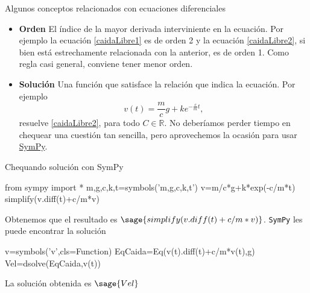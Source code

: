 \documentclass[handout,hyperref={colorlinks=true}]{beamer}
\newcommand{\rr}{\mathbb{R}}
\newcommand{\nl}{\onslide<+-> }
\begin{document}
\begin{frame}{Algunos conceptos relacionados con ecuaciones diferenciales}
\begin{itemize}
\nl  \item \textbf{Orden} El índice de la mayor derivada interviniente en la ecuación. Por ejemplo la ecuación \eqref{caidaLibre1} es de orden 2 y la
ecuación \eqref{caidaLibre2}, si bien está estrechamente relacionada con la anterior, es de orden 1. Como regla casi general, conviene tener menor orden.

\nl  \item \textbf{Solución} Una función que satisface la relación que indica la ecuación. Por ejemplo
\begin{equation}\label{SolGencaidaLibre2} v(t)=\frac{m}{c}g+ke^{-\frac{c}{m}t},\end{equation}
resuelve \eqref{caidaLibre2}, para todo $C\in\rr$. No deberíamos perder tiempo en chequear una cuestión tan sencilla, pero aprovechemos la ocasión para usar  \href{http://www.sympy.org}{SymPy}.

\end{itemize}



\end{frame}

\begin{frame}[fragile]{Chequando solución con  SymPy}

\begin{sageblock}
from sympy import *
m,g,c,k,t=symbols('m,g,c,k,t')
v=m/c*g+k*exp(-c/m*t)
simplify(v.diff(t)+c/m*v)
\end{sageblock}

Obtenemos que el resultado es $\sage{simplify(v.diff(t)+c/m*v)}$.
 \texttt{SymPy} les puede encontrar la solución

\begin{sageblock}
v=symbols('v',cls=Function)
EqCaida=Eq(v(t).diff(t)+c/m*v(t),g)
Vel=dsolve(EqCaida,v(t))
\end{sageblock}

La solución obtenida es $\sage{Vel}$
\end{frame}




 
\end{document}

